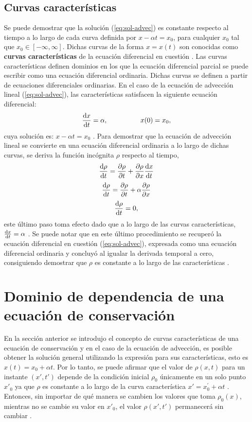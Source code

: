 \subsection{Curvas características}
Se puede demostrar que la solución (\ref{eq:sol-advec}) es constante respecto al tiempo a lo largo de cada curva definida por $x-\alpha t = x_0$, para cualquier $x_0$ tal que $x_0 \in [-\infty, \infty]$. Dichas curvas de la forma $x=x(t)$ son conocidas como \textbf{curvas características} de la ecuación diferencial en cuestión \cite{Leveque}. Las curvas características definen dominios en los que la ecuación diferencial parcial se puede escribir como una ecuación diferencial ordinaria. Dichas curvas se definen a partir de ecuaciones diferenciales ordinarias. En el caso de la ecuación de advección lineal (\ref{eq:sol-advec}), las características satisfacen la siguiente ecuación diferencial:
\begin{equation}
	\dv{x}{t} = \alpha, \hspace{1.7cm} x(0) = x_0,
\end{equation}
cuya solución es: $x-\alpha t = x_0$ \cite{Leveque}. Para demostrar que la ecuación de advección lineal se convierte en una ecuación diferencial ordinaria a lo largo de dichas curvas, se deriva la función incógnita $\rho$ respecto al tiempo,
\begin{equation}
	\dv{\rho}{t} = \pdv{\rho}{t} + \pdv{\rho}{x}\dv{x}{t}
\end{equation}
\begin{equation}
	\dv{\rho}{t} = \pdv{\rho}{t} + \alpha\pdv{\rho}{x}
\end{equation}
\begin{equation}
	\dv{\rho}{t} = 0,
\end{equation}
este último paso toma efecto dado que a lo largo de las curvas características, $\dv{x}{t} = \alpha$ \cite{Leveque}. Se puede notar que en este último procedimiento se recuperó la ecuación diferencial en cuestión (\ref{eq:sol-advec}), expresada como una ecuación diferencial ordinaria y concluyó al igualar la derivada temporal a cero, consiguiendo demostrar que $\rho$ es constante a lo largo de las características \cite{Leveque}.
\section{Dominio de dependencia de una ecuación de conservación}
En la sección anterior se introdujo el concepto de curvas características de una ecuación de conservación y en el caso de la ecuación de advección, es posible obtener la solución general utilizando la expresión para sus características, esto es $x(t) = x_0 + \alpha t$. Por lo tanto, se puede afirmar que el valor de $\rho(x,t)$ para un instante $(x',t')$ depende de la condición inicial $\rho_0$ únicamente en un solo punto $x'_{0}$ ya que $\rho$ es constante a lo largo de la curva característica $x' = x^{'}_{0} + \alpha t$ \cite{Leveque}. Entonces, sin importar de qué manera se cambien los valores que toma $\rho_0(x)$, mientras no se cambie su valor en $x'_0$, el valor $\rho(x',t')$ permanecerá sin cambiar \cite{Leveque}. 


